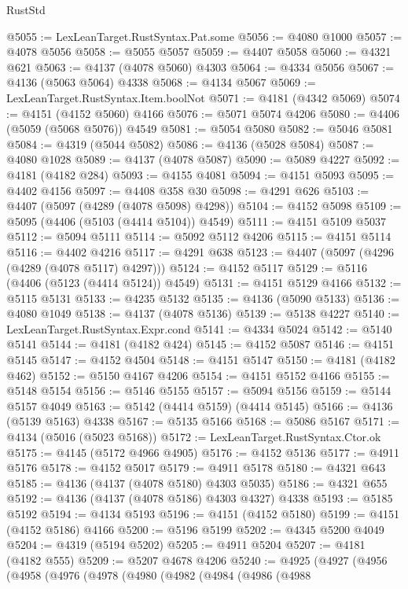 \begin{lexlean}{RustStd}
\begin{coremodule}
@5055 := LexLeanTarget.RustSyntax.Pat.some
@5056 := @4080 @1000
@5057 := @4078 @5056
@5058 := @5055 @5057
@5059 := @4407 @5058
@5060 := @4321 @621
@5063 := @4137 (@4078 @5060) @4303
@5064 := @4334 @5056
@5067 := @4136 (@5063 @5064) @4338
@5068 := @4134 @5067
@5069 := LexLeanTarget.RustSyntax.Item.boolNot
@5071 := @4181 (@4342 @5069)
@5074 := @4151 (@4152 @5060) @4166
@5076 := @5071 @5074 @4206
@5080 := @4406 (@5059 (@5068 @5076)) @4549
@5081 := @5054 @5080
@5082 := @5046 @5081
@5084 := @4319 (@5044 @5082)
@5086 := @4136 (@5028 @5084)
@5087 := @4080 @1028
@5089 := @4137 (@4078 @5087)
@5090 := @5089 @4227
@5092 := @4181 (@4182 @284)
@5093 := @4155 @4081
@5094 := @4151 @5093
@5095 := @4402 @4156
@5097 := @4408 @358 @30
@5098 := @4291 @626
@5103 := @4407 (@5097 (@4289 (@4078 @5098) @4298))
@5104 := @4152 @5098
@5109 := @5095 (@4406 (@5103 (@4414 @5104)) @4549)
@5111 := @4151 @5109 @5037
@5112 := @5094 @5111
@5114 := @5092 @5112 @4206
@5115 := @4151 @5114
@5116 := @4402 @4216
@5117 := @4291 @638
@5123 := @4407 (@5097 (@4296 (@4289 (@4078 @5117) @4297)))
@5124 := @4152 @5117
@5129 := @5116 (@4406 (@5123 (@4414 @5124)) @4549)
@5131 := @4151 @5129 @4166
@5132 := @5115 @5131
@5133 := @4235 @5132
@5135 := @4136 (@5090 @5133)
@5136 := @4080 @1049
@5138 := @4137 (@4078 @5136)
@5139 := @5138 @4227
@5140 := LexLeanTarget.RustSyntax.Expr.cond
@5141 := @4334 @5024
@5142 := @5140 @5141
@5144 := @4181 (@4182 @424)
@5145 := @4152 @5087
@5146 := @4151 @5145
@5147 := @4152 @4504
@5148 := @4151 @5147
@5150 := @4181 (@4182 @462)
@5152 := @5150 @4167 @4206
@5154 := @4151 @5152 @4166
@5155 := @5148 @5154
@5156 := @5146 @5155
@5157 := @5094 @5156
@5159 := @5144 @5157 @4049
@5163 := @5142 (@4414 @5159) (@4414 @5145)
@5166 := @4136 (@5139 @5163) @4338
@5167 := @5135 @5166
@5168 := @5086 @5167
@5171 := @4134 (@5016 (@5023 @5168))
@5172 := LexLeanTarget.RustSyntax.Ctor.ok
@5175 := @4145 (@5172 @4966 @4905)
@5176 := @4152 @5136
@5177 := @4911 @5176
@5178 := @4152 @5017
@5179 := @4911 @5178
@5180 := @4321 @643
@5185 := @4136 (@4137 (@4078 @5180) @4303 @5035)
@5186 := @4321 @655
@5192 := @4136 (@4137 (@4078 @5186) @4303 @4327) @4338
@5193 := @5185 @5192
@5194 := @4134 @5193
@5196 := @4151 (@4152 @5180)
@5199 := @4151 (@4152 @5186) @4166
@5200 := @5196 @5199
@5202 := @4345 @5200 @4049
@5204 := @4319 (@5194 @5202)
@5205 := @4911 @5204
@5207 := @4181 (@4182 @555)
@5209 := @5207 @4678 @4206
@5240 := @4925
    (@4927
      (@4956
        (@4958
          (@4976
            (@4978
              (@4980
                (@4982
                  (@4984
                    (@4986
                      (@4988

\end{coremodule}
\end{lexlean}
